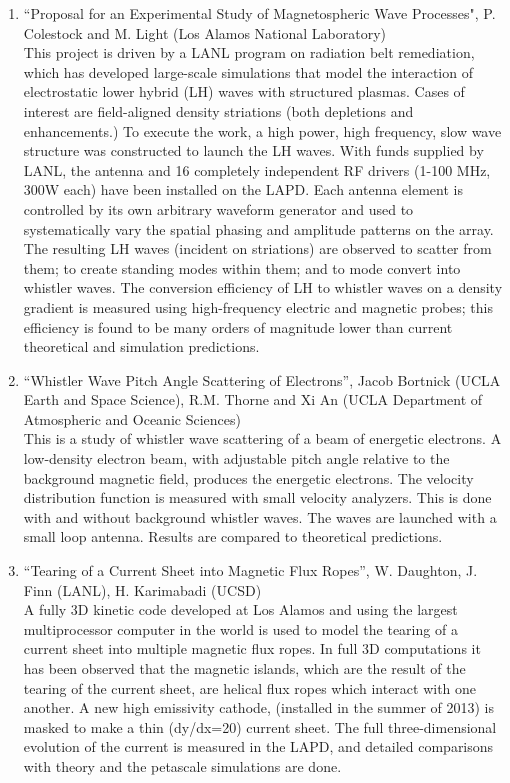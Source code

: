 \documentclass[11pt]{article}
\begin{document}
\begin{enumerate}
\item ``Proposal for an Experimental Study of Magnetospheric Wave Processes",
P. Colestock and M. Light (Los Alamos National Laboratory)\\
This project is driven by a LANL program on radiation belt remediation, which has developed large-scale simulations that model the interaction of electrostatic lower hybrid (LH) waves with structured plasmas.  Cases of interest are field-aligned density striations (both depletions and enhancements.) To execute the work, a high power, high frequency, slow wave structure was constructed to launch the LH waves. With funds supplied by LANL, the antenna and 16 completely independent RF drivers (1-100 MHz, 300W each) have been installed on the LAPD. Each antenna element is controlled by its own arbitrary waveform generator and used to systematically vary the spatial phasing and amplitude patterns on the array.  The resulting LH waves (incident on striations) are observed to scatter from them; to create standing modes within them; and to mode convert into whistler waves.  The conversion efficiency of LH to whistler waves on a density gradient is measured using high-frequency electric and magnetic probes; this efficiency is found to be many orders of magnitude lower than current theoretical and simulation predictions. 

\item ``Whistler Wave Pitch Angle Scattering of Electrons'', Jacob
  Bortnick (UCLA Earth and Space Science), R.M. Thorne and Xi An (UCLA
  Department of Atmospheric and Oceanic Sciences)\\ This is a study of
  whistler wave scattering of a beam of energetic electrons. A
  low-density electron beam, with adjustable pitch angle relative to
  the background magnetic field, produces the energetic
  electrons. The velocity distribution function is measured with
  small velocity analyzers. This is done with and without
  background whistler waves. The waves are launched with a small
  loop antenna. Results are compared to theoretical predictions.

\item ``Tearing of a Current Sheet into Magnetic Flux Ropes'',
  W. Daughton, J. Finn (LANL), H. Karimabadi (UCSD)\\ A fully 3D
  kinetic code developed at Los Alamos and using the largest
  multiprocessor computer in the world is used to model the
  tearing of a current sheet into multiple magnetic flux ropes. In
  full 3D computations it has been observed that the magnetic islands,
  which are the result of the tearing of the current sheet, are helical
  flux ropes which interact with one another. A new high emissivity
  cathode, (installed in the summer of 2013) is masked to
  make a thin (dy/dx=20) current sheet. The full three-dimensional
  evolution of the current is measured in the LAPD, and detailed
  comparisons with theory and the petascale simulations are done.



\end{enumerate}
\end{document}
